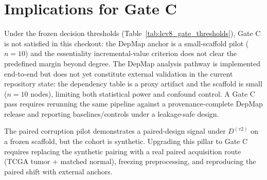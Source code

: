 \documentclass[11pt]{article}
\begin{document}
\section*{Implications for Gate C}
Under the frozen decision thresholds (Table~\ref{tab:lev8_gate_thresholds}), Gate C is not satisfied in this checkout: the DepMap anchor is a small-scaffold pilot ($n=10$) and the essentiality incremental-value criterion does not clear the predefined margin beyond degree. The DepMap analysis pathway is implemented end-to-end but does not yet constitute external validation in the current repository state: the dependency table is a proxy artifact and the scaffold is small ($n=10$ nodes), limiting both statistical power and confound control. A Gate C pass requires rerunning the same pipeline against a provenance-complete DepMap release and reporting baselines/controls under a leakage-safe design.

The paired corruption pilot demonstrates a paired-design signal under $D^{(v2)}$ on a frozen scaffold, but the cohort is synthetic. Upgrading this pillar to Gate C requires replacing the synthetic pairing with a real paired acquisition route (TCGA tumor + matched normal), freezing preprocessing, and reproducing the paired shift with external anchors.
\end{document}
